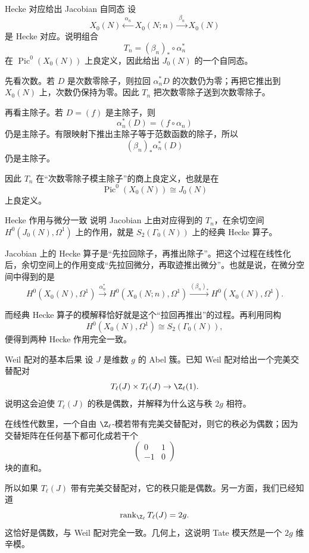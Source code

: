 \begin{problem}{Hecke 对应给出 Jacobian 自同态}
\medium
设
\[
X_0(N) \xleftarrow{\ \alpha_n\ } X_0(N;n) \xrightarrow{\ \beta_n\ } X_0(N)
\]
是 Hecke 对应。说明组合
\[
T_n=(\beta_n)_*\circ \alpha_n^*
\]
在 $\operatorname{Pic}^0(X_0(N))$ 上良定义，因此给出 $J_0(N)$ 的一个自同态。
\end{problem}
\begin{solution}
先看次数。若 $D$ 是次数零除子，则拉回 $\alpha_n^*D$ 的次数仍为零；再把它推出到 $X_0(N)$ 上，次数仍保持为零。因此 $T_n$ 把次数零除子送到次数零除子。

再看主除子。若 $D=(f)$ 是主除子，则
\[
\alpha_n^*(D)=(f\circ \alpha_n)
\]
仍是主除子。有限映射下推出主除子等于范数函数的除子，所以
\[
(\beta_n)_*\alpha_n^*(D)
\]
仍是主除子。

因此 $T_n$ 在“次数零除子模主除子”的商上良定义，也就是在
\[
\operatorname{Pic}^0(X_0(N))\cong J_0(N)
\]
上良定义。
\end{solution}

\begin{problem}{Hecke 作用与微分一致}
\medium
说明 Jacobian 上由对应得到的 $T_n$，在余切空间 $H^0(J_0(N),\Omega^1)$ 上的作用，就是 $S_2(\Gamma_0(N))$ 上的经典 Hecke 算子。
\end{problem}
\begin{solution}
Jacobian 上的 Hecke 算子是“先拉回除子，再推出除子”。把这个过程在线性化后，余切空间上的作用变成“先拉回微分，再取迹推出微分”。也就是说，在微分空间中得到的是
\[
H^0(X_0(N),\Omega^1)\xrightarrow{\alpha_n^*} H^0(X_0(N;n),\Omega^1)
\xrightarrow{(\beta_n)_*} H^0(X_0(N),\Omega^1).
\]

而经典 Hecke 算子的模解释恰好就是这个“拉回再推出”的过程。再利用同构
\[
H^0(X_0(N),\Omega^1)\cong S_2(\Gamma_0(N)),
\]
便得到两种 Hecke 作用完全一致。
\end{solution}

\begin{problem}{Weil 配对的基本后果}
\medium
设 $J$ 是维数 $g$ 的 Abel 簇。已知 Weil 配对给出一个完美交替配对
\[
T_\ell(J)\times T_\ell(J)\to \Z_\ell(1).
\]
说明这会迫使 $T_\ell(J)$ 的秩是偶数，并解释为什么这与秩 $2g$ 相符。
\end{problem}
\begin{solution}
在线性代数里，一个自由 $\Z_\ell$-模若带有完美交替配对，则它的秩必为偶数；因为交替矩阵在任何基下都可化成若干个
\[
\begin{pmatrix}
0&1\\
-1&0
\end{pmatrix}
\]
块的直和。

所以如果 $T_\ell(J)$ 带有完美交替配对，它的秩只能是偶数。另一方面，我们已经知道
\[
\operatorname{rank}_{\Z_\ell} T_\ell(J)=2g.
\]
这恰好是偶数，与 Weil 配对完全一致。几何上，这说明 Tate 模天然是一个 $2g$ 维辛模。
\end{solution}

